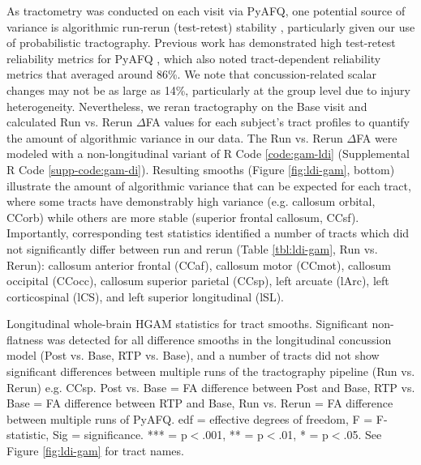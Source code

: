 \documentclass[12pt]{article}
\begin{document}
As tractometry was conducted on each visit via PyAFQ, one potential source of variance is algorithmic run-rerun (test-retest) stability \parencite{wang2011LongitudinalChangesStructural}, particularly given our use of probabilistic tractography. Previous work has demonstrated high test-retest reliability metrics for PyAFQ \parencite{kruper2021EvaluatingReliabilityHuman}, which also noted tract-dependent reliability metrics that averaged around 86\%. We note that concussion-related scalar changes may not be as large as 14\%, particularly at the group level due to injury heterogeneity. Nevertheless, we reran tractography on the Base visit and calculated Run vs. Rerun $\Delta$FA values for each subject's tract profiles to quantify the amount of algorithmic variance in our data. The Run vs. Rerun $\Delta$FA were modeled with a non-longitudinal variant of R Code \ref{code:gam-ldi} (Supplemental R Code \ref{supp-code:gam-di}). Resulting smooths (Figure \ref{fig:ldi-gam}, bottom) illustrate the amount of algorithmic variance that can be expected for each tract, where some tracts have demonstrably high variance (e.g. callosum orbital, CCorb) while others are more stable (superior frontal callosum, CCsf). Importantly, corresponding test statistics identified a number of tracts which did not significantly differ between run and rerun (Table \ref{tbl:ldi-gam}, Run vs. Rerun): callosum anterior frontal (CCaf), callosum motor (CCmot), callosum occipital (CCocc), callosum superior parietal (CCsp), left arcuate (lArc), left corticospinal (lCS), and left superior longitudinal (lSL).

\begin{table}[H]
	\scriptsize
	
	\caption{Longitudinal whole-brain HGAM statistics for tract smooths. Significant non-flatness was detected for all difference smooths in the longitudinal concussion model (Post vs. Base, RTP vs. Base), and a number of tracts did not show significant differences between multiple runs of the tractography pipeline (Run vs. Rerun) e.g. CCsp. Post vs. Base = FA difference between Post and Base, RTP vs. Base = FA difference between RTP and Base, Run vs. Rerun = FA difference between multiple runs of PyAFQ. edf = effective degrees of freedom, F = F-statistic, Sig = significance. *** = p$<$.001, ** = p$<$.01, * = p$<$.05. See Figure \ref{fig:ldi-gam} for tract names.}
	\label{tbl:ldi-gam}
\end{table}
\end{document}
